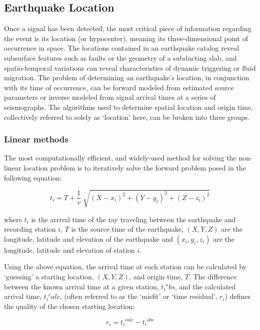 \subsection{Earthquake Location}
Once a signal has been detected, the most critical piece of information regarding the event is its location (or hypocenter), meaning its three-dimensional point of occurrence in space. The locations contained in an earthquake catalog reveal subsurface features such as faults or the geometry of a subducting slab, and spatio-temporal variations can reveal characteristics of dynamic triggering or fluid migration. The problem of determining an earthquake's location, in conjunction with its time of occurrence, can be forward modeled from estimated source parameters or inverse modeled from signal arrival times at a series of seismographs. The algorithms used to determine spatial location and origin time, collectively referred to solely as `location' here, can be broken into three groups.

\subsubsection{Linear methods}\label{linloc}
The most computationally efficient, and widely-used method for solving the non-linear location problem is to iteratively solve the forward problem posed in the following equation:

\begin{equation}
t_i = T + \frac{1}{v}\sqrt[]{(X - x_i)^2 + (Y - y_i)^2 + (Z - z_i)^2}
\end{equation}

where $t_i$ is the arrival time of the ray traveling between the earthquake and recording station $i$, $T$ is the source time of the earthquake, $(X, Y, Z)$ are the longitude, latitude and elevation of the earthquake and $(x_i, y_i, z_i)$ are the longitude, latitude and elevation of station $i$.

Using the above equation, the arrival time at each station can be calculated by `guessing' a starting location, $(X, Y, Z)$, and origin time, $T$. The difference between the known arrival time at a given station, ${t_i}^obs$, and the calculated arrival time, ${t_i}^calc$, (often referred to as the `misfit' or `time residual', $r_i$) defines the quality of the chosen starting location:

\begin{equation}
r_i = {t_i}^{calc} - {t_i}^{obs}
\end{equation}

